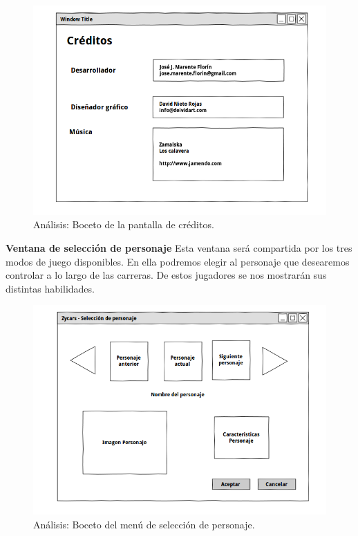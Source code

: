 \begin{description}
        \begin{figure}[H]
          \label{diagrama_casos_uso}
          \begin{center}
            \includegraphics[scale=0.42]{imagenes/analisis/boceto_creditos.png}
          \end{center}
          \caption{Análisis: Boceto de la pantalla de créditos.}
        \end{figure}
    
    \item \textbf{Ventana de selección de personaje} Esta ventana será compartida por los tres modos de juego disponibles. En ella 
    podremos elegir al personaje que desearemos controlar a lo largo de las carreras. De estos jugadores se nos mostrarán sus 
    distintas habilidades.

        \begin{figure}[H]
          \label{diagrama_casos_uso}
          \begin{center}
            \includegraphics[scale=0.42]{imagenes/analisis/boceto_menu_personaje.png}
          \end{center}
          \caption{Análisis: Boceto del menú de selección de personaje.}
        \end{figure}
    

\end{description}

